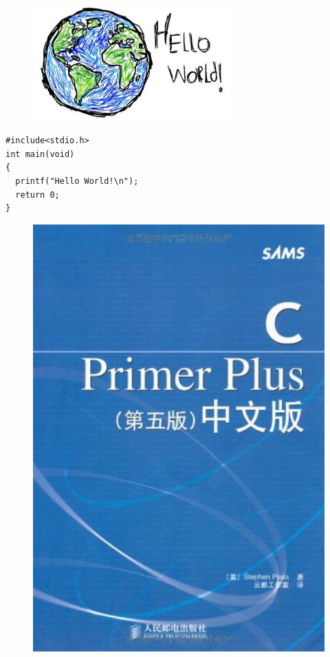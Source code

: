 \begin{frame}[fragile]
\begin{figure}
\centering
\includegraphics[width=3in]{ch01/images/helloworld.jpg}
\end{figure}

\begin{lstlisting}
#include<stdio.h>
int main(void)
{
  printf("Hello World!\n");
  return 0;
}
\end{lstlisting}

\end{frame}

\begin{frame}
\begin{figure}
\centering
\includegraphics[width=2.in]{ch01/images/cprimerplus.jpg}
\end{figure}
\end{frame}
